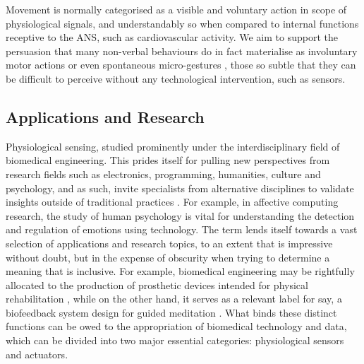 Movement is normally categorised as a visible and voluntary action in scope of physiological signals, and understandably so when compared to internal functions receptive to the ANS, such as cardiovascular activity. We aim to support the persuasion that many non-verbal behaviours do in fact materialise as involuntary motor actions \cite{Haueisen} or even spontaneous micro-gestures \cite{Chen_Analyze}, those so subtle that they can be difficult to perceive without any technological intervention, such as sensors.




\subsection{Applications and Research}

Physiological sensing, studied prominently under the interdisciplinary field of biomedical engineering. This prides itself for pulling new perspectives from research fields such as electronics, programming, humanities, culture and psychology, and as such, invite specialists from alternative disciplines to validate insights outside of traditional practices \cite{enderle_introduction_2012}. For example, in affective computing research, the study of human psychology is vital for understanding the detection and regulation of emotions using technology. The term lends itself towards a vast selection of applications and research topics, to an extent that is impressive without doubt, but in the expense of obscurity when trying to determine a meaning that is inclusive. For example, biomedical engineering may be rightfully allocated to the production of prosthetic devices intended for physical rehabilitation \cite{valentinuzzi_physical_2019}, while on the other hand, it serves as a relevant label for say, a biofeedback system design for guided meditation \cite{foo_soft_2020}. What binds these distinct functions can be owed to the appropriation of biomedical technology and data, which can be divided into two major essential categories: physiological sensors and actuators.


